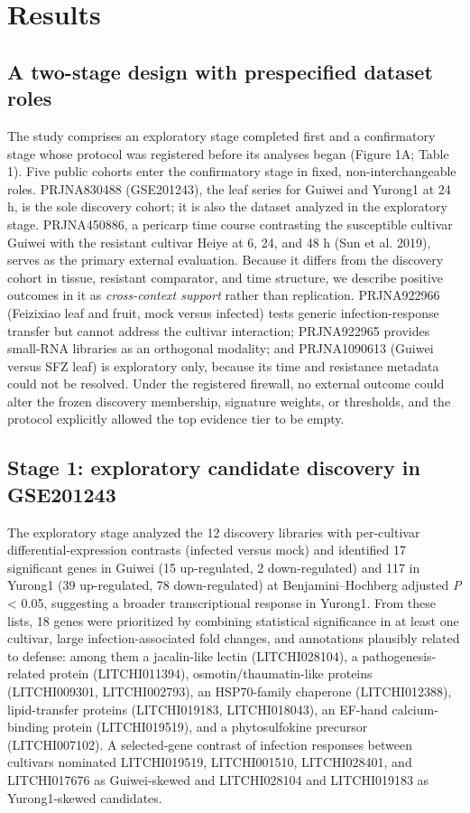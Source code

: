 \documentclass[12pt,letterpaper]{article}
\begin{document}
\section*{Results}

\subsection*{A two-stage design with prespecified dataset roles}

The study comprises an exploratory stage completed first and a confirmatory stage whose protocol was registered before its analyses began (Figure 1A; Table 1). Five public cohorts enter the confirmatory stage in fixed, non-interchangeable roles. PRJNA830488 (GSE201243), the leaf series for Guiwei and Yurong1 at 24 h, is the sole discovery cohort; it is also the dataset analyzed in the exploratory stage. PRJNA450886, a pericarp time course contrasting the susceptible cultivar Guiwei with the resistant cultivar Heiye at 6, 24, and 48 h (Sun et al. 2019), serves as the primary external evaluation. Because it differs from the discovery cohort in tissue, resistant comparator, and time structure, we describe positive outcomes in it as \textit{cross-context support} rather than replication. PRJNA922966 (Feizixiao leaf and fruit, mock versus infected) tests generic infection-response transfer but cannot address the cultivar interaction; PRJNA922965 provides small-RNA libraries as an orthogonal modality; and PRJNA1090613 (Guiwei versus SFZ leaf) is exploratory only, because its time and resistance metadata could not be resolved. Under the registered firewall, no external outcome could alter the frozen discovery membership, signature weights, or thresholds, and the protocol explicitly allowed the top evidence tier to be empty.

\subsection*{Stage 1: exploratory candidate discovery in GSE201243}

The exploratory stage analyzed the 12 discovery libraries with per-cultivar differential-expression contrasts (infected versus mock) and identified 17 significant genes in Guiwei (15 up-regulated, 2 down-regulated) and 117 in Yurong1 (39 up-regulated, 78 down-regulated) at Benjamini–Hochberg adjusted \textit{P} < 0.05, suggesting a broader transcriptional response in Yurong1. From these lists, 18 genes were prioritized by combining statistical significance in at least one cultivar, large infection-associated fold changes, and annotations plausibly related to defense: among them a jacalin-like lectin (LITCHI028104), a pathogenesis-related protein (LITCHI011394), osmotin/thaumatin-like proteins (LITCHI009301, LITCHI002793), an HSP70-family chaperone (LITCHI012388), lipid-transfer proteins (LITCHI019183, LITCHI018043), an EF-hand calcium-binding protein (LITCHI019519), and a phytosulfokine precursor (LITCHI007102). A selected-gene contrast of infection responses between cultivars nominated LITCHI019519, LITCHI001510, LITCHI028401, and LITCHI017676 as Guiwei-skewed and LITCHI028104 and LITCHI019183 as Yurong1-skewed candidates.
\end{document}
